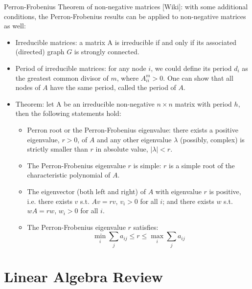 \documentclass{report}
\begin{document}
Perron-Frobenius Theorem of non-negative matrices [Wiki]: with some additional conditions, the Perron-Frobenius results can be applied to non-negative matrices as well: 
\begin{itemize}
\item Irreducible matrices: a matrix A is irreducible if and only if its associated (directed) graph $G$ is strongly connected. 

\item Period of irreducible matrices: for any node $i$, we could define its period $d_i$ as the greatest common divisor of $m$, where $A^m_{ii} > 0$. One can show that all nodes of $A$ have the same period, called the period of $A$. 

\item Theorem: let A be an irreducible non-negative $n \times n$ matrix with period $h$, then the following statements hold: 
\begin{itemize}
\item Perron root or the Perron-Frobenius eigenvalue: there exists a positive eigenvalue, $r > 0$, of $A$ and any other eigenvalue $\lambda$ (possibly, complex) is strictly smaller than $r$ in absolute value, $|\lambda| < r$.
\item The Perron-Frobenius eigenvalue $r$ is simple: $r$ is a simple root of the characteristic polynomial of $A$. 
\item The eigenvector (both left and right) of $A$ with eigenvalue $r$ is positive, i.e. there exists $v$ s.t. $A v = r v$, $v_i > 0$ for all $i$; and there exists $w$ s.t. $w A = r w$, $w_i > 0$ for all $i$. 
\item The Perron-Frobenius eigenvalue $r$ satisfies: 
\begin{equation}
\min_i \sum_j a_{ij} \leq r \leq 	\max_i \sum_j a_{ij}
\end{equation}
\end{itemize}
\end{itemize}
\section{Linear Algebra Review}
\end{document}
